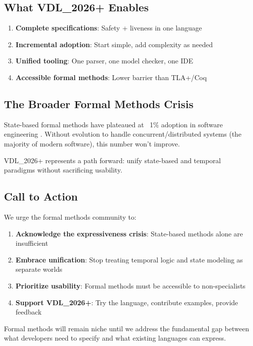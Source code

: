 \documentclass[11pt]{article}
\begin{document}
\subsection{What VDL\_2026+ Enables}

\begin{enumerate}
\item \textbf{Complete specifications}: Safety + liveness in one language
\item \textbf{Incremental adoption}: Start simple, add complexity as needed
\item \textbf{Unified tooling}: One parser, one model checker, one IDE
\item \textbf{Accessible formal methods}: Lower barrier than TLA+/Coq
\end{enumerate}

\subsection{The Broader Formal Methods Crisis}

State-based formal methods have plateaued at ~1\% adoption in software engineering \cite{woodcock2009}. Without evolution to handle concurrent/distributed systems (the majority of modern software), this number won't improve.

VDL\_2026+ represents a path forward: unify state-based and temporal paradigms without sacrificing usability.

\subsection{Call to Action}

We urge the formal methods community to:

\begin{enumerate}
\item \textbf{Acknowledge the expressiveness crisis}: State-based methods alone are insufficient
\item \textbf{Embrace unification}: Stop treating temporal logic and state modeling as separate worlds
\item \textbf{Prioritize usability}: Formal methods must be accessible to non-specialists
\item \textbf{Support VDL\_2026+}: Try the language, contribute examples, provide feedback
\end{enumerate}

Formal methods will remain niche until we address the fundamental gap between what developers need to specify and what existing languages can express.
\end{document}

